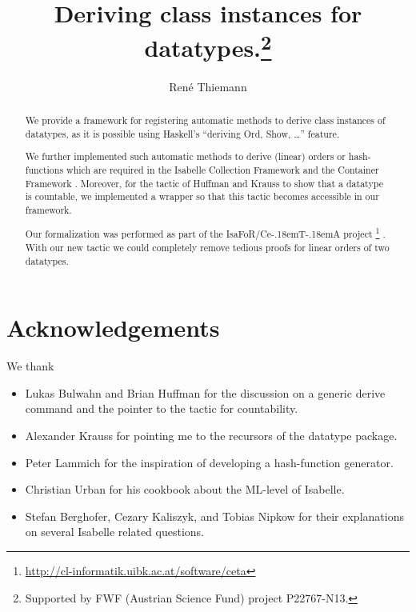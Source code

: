 \documentclass[11pt,a4paper]{article}
\newcommand\isafor{\textsf{IsaFoR}}
\newcommand\ceta{\textsf{Ce\kern-.18emT\kern-.18emA}}
\begin{document}
\title{Deriving class instances for datatypes.\footnote{Supported by FWF (Austrian Science Fund) project P22767-N13.}}
\author{Ren\'e Thiemann}
\maketitle

\begin{abstract}
  We provide a framework for registering automatic methods 
  to derive class instances 
  of datatypes, 
  as it is possible using Haskell's ``deriving Ord, Show, \ldots'' feature.
  
  We further implemented such automatic methods to derive (linear) orders or
  hash-functions which are required in the 
  Isabelle Collection Framework \cite{rbt} and the Container Framework \cite{containers}. 
  Moreover, for the tactic of
  Huffman and Krauss to show that a datatype is countable, we implemented a 
  wrapper so that this tactic becomes accessible in our framework.
  
  Our formalization was performed as part of the \isafor/\ceta{} project%
  \footnote{\url{http://cl-informatik.uibk.ac.at/software/ceta}} \cite{CeTA}.
  With our new tactic we could completely remove 
  tedious proofs for linear orders of two datatypes.
\end{abstract}

\tableofcontents




\section{Acknowledgements}
We thank 
\begin{itemize}
\item Lukas Bulwahn and Brian Huffman for the discussion on a generic derive command and 
  the pointer to
  the tactic for countability.
\item Alexander Krauss for pointing me to the
  recursors of the datatype package.
\item Peter Lammich for the inspiration of developing a hash-function generator.
\item Christian Urban for his cookbook about the ML-level of Isabelle.
\item Stefan Berghofer, Cezary Kaliszyk, and Tobias Nipkow for their explanations
  on several Isabelle related questions.
\end{itemize}



\end{document}
